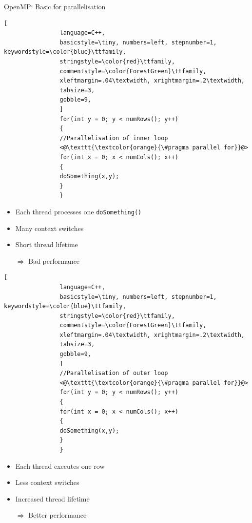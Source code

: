 \documentclass[shortpres,usenames,dvipsnames]{beamer}
\begin{document}
		\begin{frame}[containsverbatim]{OpenMP: Basic for parallelisation}
			\begin{multicols}{2}
				\begin{lstlisting}[
				language=C++,
				basicstyle=\tiny, numbers=left, stepnumber=1, keywordstyle=\color{blue}\ttfamily,
				stringstyle=\color{red}\ttfamily,
				commentstyle=\color{ForestGreen}\ttfamily,
				xleftmargin=.04\textwidth, xrightmargin=.2\textwidth,
				tabsize=3,
				gobble=9,
				]
				for(int y = 0; y < numRows(); y++)
				{
				//Parallelisation of inner loop
				<@\texttt{\textcolor{orange}{\#pragma parallel for}}@>
				for(int x = 0; x < numCols(); x++)
				{
				doSomething(x,y);
				}
				}
				\end{lstlisting}
				
				\begin{itemize}
					\item Each thread processes one \verb|doSomething()|
					\item Many context switches
					\item Short thread lifetime
					\item[$\Rightarrow$] Bad performance 
				\end{itemize}
				
				\columnbreak
				
				\begin{lstlisting}[
				language=C++,
				basicstyle=\tiny, numbers=left, stepnumber=1, keywordstyle=\color{blue}\ttfamily,
				stringstyle=\color{red}\ttfamily,
				commentstyle=\color{ForestGreen}\ttfamily,
				xleftmargin=.04\textwidth, xrightmargin=.2\textwidth,
				tabsize=3,
				gobble=9,
				]
				//Parallelisation of outer loop
				<@\texttt{\textcolor{orange}{\#pragma parallel for}}@>
				for(int y = 0; y < numRows(); y++)
				{
				for(int x = 0; x < numCols(); x++)
				{
				doSomething(x,y);
				}
				}
				\end{lstlisting}
				
				\begin{itemize}
					\item Each thread executes one row
					\item Less context switches
					\item Increased thread lifetime
					\item[$\Rightarrow$] Better performance
				\end{itemize}
			\end{multicols}
		\end{frame}
		
\end{document}
